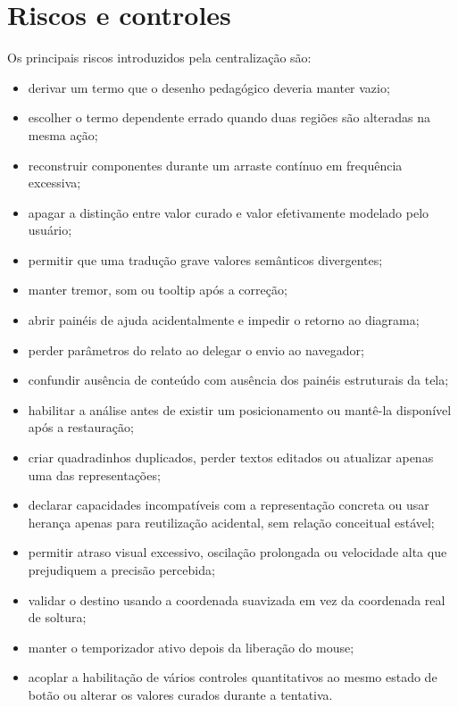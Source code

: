 \documentclass[12pt,a4paper]{article}
\begin{document}
\section{Riscos e controles}

Os principais riscos introduzidos pela centralização são:
\begin{itemize}[noitemsep]
  \item derivar um termo que o desenho pedagógico deveria manter vazio;
  \item escolher o termo dependente errado quando duas regiões são alteradas na mesma ação;
  \item reconstruir componentes durante um arraste contínuo em frequência excessiva;
  \item apagar a distinção entre valor curado e valor efetivamente modelado pelo usuário;
  \item permitir que uma tradução grave valores semânticos divergentes;
  \item manter tremor, som ou tooltip após a correção;
  \item abrir painéis de ajuda acidentalmente e impedir o retorno ao diagrama;
  \item perder parâmetros do relato ao delegar o envio ao navegador;
  \item confundir ausência de conteúdo com ausência dos painéis estruturais da tela;
  \item habilitar a análise antes de existir um posicionamento ou mantê-la disponível após a restauração;
  \item criar quadradinhos duplicados, perder textos editados ou atualizar apenas uma das representações;
  \item declarar capacidades incompatíveis com a representação concreta ou usar herança apenas para reutilização acidental, sem relação conceitual estável;
  \item permitir atraso visual excessivo, oscilação prolongada ou velocidade alta que prejudiquem a precisão percebida;
  \item validar o destino usando a coordenada suavizada em vez da coordenada real de soltura;
  \item manter o temporizador ativo depois da liberação do mouse;
  \item acoplar a habilitação de vários controles quantitativos ao mesmo estado de botão ou alterar os valores curados durante a tentativa.
\end{itemize}
\end{document}
